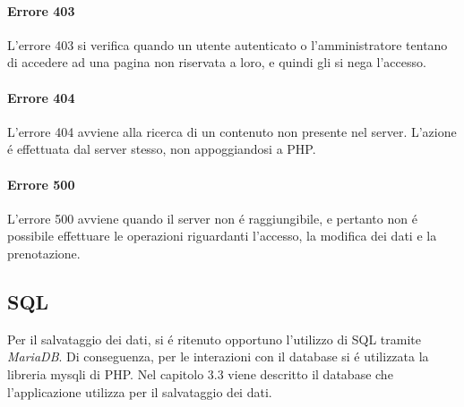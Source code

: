 \documentclass[]{article}
\begin{document}
\paragraph*{Errore 403}
L'errore 403 si verifica quando un utente autenticato o l'amministratore tentano di accedere ad una pagina non riservata a loro, e quindi gli si nega l'accesso.
\paragraph*{Errore 404}
L'errore 404 avviene alla ricerca di un contenuto non presente nel server. L'azione é effettuata dal server stesso, non appoggiandosi a PHP.
\paragraph*{Errore 500}
L'errore 500 avviene quando il server non é raggiungibile, e pertanto non é possibile effettuare le operazioni riguardanti l'accesso, la modifica dei dati e la prenotazione.
\subsection{SQL}	%
Per il salvataggio dei dati, si é ritenuto opportuno l'utilizzo di SQL tramite \textit{MariaDB}.
Di conseguenza, per le interazioni con il database si é utilizzata la libreria mysqli di PHP.
Nel capitolo 3.3 viene descritto il database che l'applicazione utilizza per il salvataggio dei dati.
\end{document}
